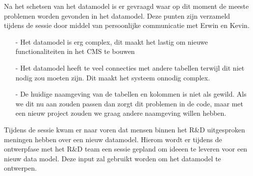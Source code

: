 \whitespace[2]
Na het schetsen van het datamodel is er gevraagd waar op dit moment de meeste problemen worden gevonden in het datamodel.
Deze punten zijn verzameld tijdens de sessie door middel van persoonlijke communicatie met Erwin en Kevin.
\begin{itemize}
    \item[-]{Het datamodel is erg complex, dit maakt het lastig om nieuwe functionaliteiten in het CMS te bouwen}
    \item[-]{Het datamodel heeft te veel connecties met andere tabellen terwijl dit niet nodig zou moeten zijn.
        Dit maakt het systeem onnodig complex.}
    \item[-]{De huidige naamgeving van de tabellen en kolommen is niet als gewild.
        Als we dit nu aan zouden passen dan zorgt dit problemen in de code, maar met een nieuw project zouden we graag andere naamgeving willen hebben.}
\end{itemize}

\whitespace
{}
Tijdens de sessie kwam er naar voren dat mensen binnen het R\&D uitgesproken meningen hebben over een nieuw datamodel.
Hierom wordt er tijdens de ontwerpfase met het R\&D team een sessie gepland om ideeen te leveren voor een nieuw data model.
Deze input zal gebruikt worden om het datamodel te ontwerpen.
